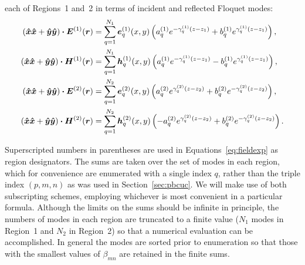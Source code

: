 each of Regions~1 and~2 in terms of 
incident and reflected Floquet modes:
\begin{subequations}
  \begin{align}
    (\boldsymbol{\hat{x}}\boldsymbol{\hat{x}}+\boldsymbol{\hat{y}}\boldsymbol{\hat{y}}) \boldsymbol{\cdot} \boldsymbol{E}^{(1)}(\boldsymbol{r}) &= 
    \sum_{q=1}^{N_1}
    \boldsymbol{e}^{(1)}_{q}(x,y) 
    \left(
      a^{(1)}_{q} e^{-\gamma^{(1)}_{q} (z-z_1)} + b^{(1)}_{q} e^{\gamma^{(1)}_{q} (z-z_1)}
    \right), \\
    (\boldsymbol{\hat{x}}\boldsymbol{\hat{x}}+\boldsymbol{\hat{y}}\boldsymbol{\hat{y}}) \boldsymbol{\cdot} \boldsymbol{H}^{(1)}(\boldsymbol{r}) &= 
    \sum_{q=1}^{N_1}
    \boldsymbol{h}^{(1)}_{q}(x,y) 
    \left(
      a^{(1)}_{q} e^{-\gamma^{(1)}_{q} (z-z_1)} - b^{(1)}_{q} e^{\gamma^{(1)}_{q} (z-z_1)}
    \right), \\
    (\boldsymbol{\hat{x}}\boldsymbol{\hat{x}}+\boldsymbol{\hat{y}}\boldsymbol{\hat{y}}) \boldsymbol{\cdot} \boldsymbol{E}^{(2)}(\boldsymbol{r}) &= 
    \sum_{q=1}^{N_2}
    \boldsymbol{e}^{(2)}_{q}(x,y) 
    \left(
      a^{(2)}_{q} e^{\gamma^{(2)}_{q} (z-z_2)} + b^{(2)}_{q} e^{-\gamma^{(2)}_{q} (z-z_2)}
    \right), \\
    (\boldsymbol{\hat{x}}\boldsymbol{\hat{x}}+\boldsymbol{\hat{y}}\boldsymbol{\hat{y}}) \boldsymbol{\cdot} \boldsymbol{H}^{(2)}(\boldsymbol{r}) &= 
    \sum_{q=1}^{N_2}
    \boldsymbol{h}^{(2)}_{q}(x,y) 
    \left(
      -a^{(2)}_{q} e^{\gamma^{(2)}_{q} (z-z_2)} + b^{(2)}_{q} e^{-\gamma^{(2)}_{q} (z-z_2)}
    \right).
  \end{align}
  \label{eq:fieldexp}
\end{subequations}

\noindent
Superscripted numbers in parentheses are used in Equations~\eqref{eq:fieldexp} 
as region designators. The sums are taken over the set of modes in each region, which
for convenience are enumerated with a single index $q$, rather than
the triple index $(p,m,n)$ as was used in Section~\ref{sec:pbcuc}.  We will
make use of both subscripting schemes,  employing whichever is most
convenient in a particular formula.  Although
the limits on the sums should be infinite in principle, the numbers of
modes in each region are truncated to a finite value ($N_1$ modes in
Region~1 and $N_2$ in Region~2) so that a numerical evaluation can be
accomplished.
In general the modes are sorted prior to enumeration so that those
with the smallest values of $\beta_{mn}$ are retained in the finite sums.


